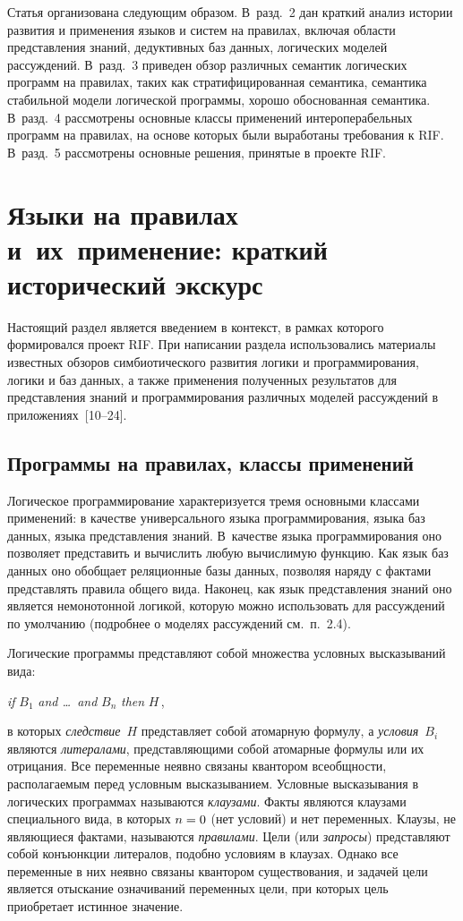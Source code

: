 \begin{multicols}{2}
Статья организована следующим образом. 
В~разд.~2 дан краткий анализ истории развития и применения языков и систем на 
правилах, включая области представления знаний, дедуктивных баз данных, логических 
моделей рассуждений. В~разд.~3 приведен обзор различных семантик логических 
программ на правилах, таких как стратифицированная семантика, семантика стабильной 
модели логической программы, хорошо обоснованная семантика. В~разд.~4 рассмотрены 
основные классы применений интероперабельных программ на правилах, на основе 
которых были выработаны требования к RIF. В~разд.~5 рассмотрены основные решения, 
принятые в проекте RIF.

\section{Языки на правилах и~их~применение: краткий исторический 
экскурс}

Настоящий раздел является введением в контекст, в рамках которого формировался проект 
RIF. При написании раздела использовались материалы известных обзоров 
симбиотического развития логики и программирования, логики и баз данных, а также 
применения полученных результатов для представления знаний и программирования 
различных моделей рассуждений в приложениях~[10--24].
   
   \subsection{Программы на правилах, классы применений} %
Логическое программирование характеризуется тремя основными классами применений: в 
качестве универсального языка программирования, языка баз данных, языка 
представления знаний. В~качестве языка программирования оно позволяет представить и 
вычислить любую вычислимую функцию. Как язык баз данных оно обобщает реляционные 
базы данных, позволяя наряду с фактами представлять правила общего вида. Наконец, как 
язык представления знаний оно является немонотонной логикой, которую можно 
использовать для рассуждений по умолчанию (подробнее о моделях рассуждений см.\ 
п.~2.4).

Логические программы представляют собой множества условных высказываний вида:

\textit{if} $B_1$ \textit{and \ldots\  and} $B_n$ \textit{then} $H$\,,

\noindent
в которых \textit{следствие}~$H$ представляет собой атомарную формулу, а 
\textit{условия}~$B_i$ являются \textit{литералами}, представляющими собой атомарные 
формулы или их отрицания. Все переменные неявно связаны квантором всеобщности, 
располагаемым перед условным высказыванием. Условные высказывания в логических 
программах называются \textit{клаузами}. Факты являются клаузами специального вида, в 
которых $n\hm= 0$ (нет условий) и нет переменных. Клаузы, не являющиеся фактами, 
называются \textit{правилами}. Цели (или \textit{запросы}) представляют собой 
конъюнкции литералов, подобно условиям в клаузах. Однако все переменные в них неявно 
связаны квантором существования, и задачей цели является отыскание означиваний 
переменных цели, при которых цель приобретает истинное значение.


\end{multicols}
